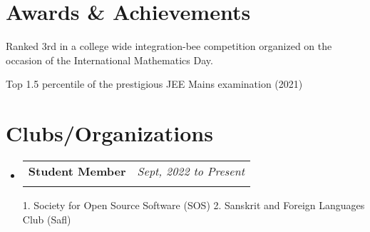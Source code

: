 \documentclass[letterpaper,11pt]{article}
\makeatletter
\newcommand{\resumeOrganizationHeading}[4]{
  \vspace{-2pt}\item
    \begin{tabular*}{0.97\textwidth}[t]{l@{\extracolsep{\fill}}r}
      \textbf{#1} & \textit{\small #2} \\
      \textit{\small#3}
    \end{tabular*}\vspace{-7pt}
}
\newcommand{\resumeSubHeadingListStart}{\begin{itemize}[leftmargin=0.15in, label={}]}
\newcommand{\resumeSubHeadingListEnd}{\end{itemize}}
\makeatother
\begin{document}
\section{Awards \& Achievements}
\vspace{2pt}
\resumeSubHeadingListStart
\small{\item{
	            {Ranked 3rd in a college wide integration-bee competition organized on the occasion of the International Mathematics Day.} \\ \vspace{3pt}

	            {Top 1.5 percentile of the prestigious JEE Mains examination (2021)} \\ \vspace{3pt}

	      }}
\resumeSubHeadingListEnd




\section{Clubs/Organizations}
\resumeSubHeadingListStart
\resumeOrganizationHeading{Student Member}{Sept, 2022 to Present}{}{}
{1. Society for Open Source Software (SOS)}
\linebreak
{2. Sanskrit and Foreign Languages Club (Safl)}
\resumeSubHeadingListEnd
\end{document}
